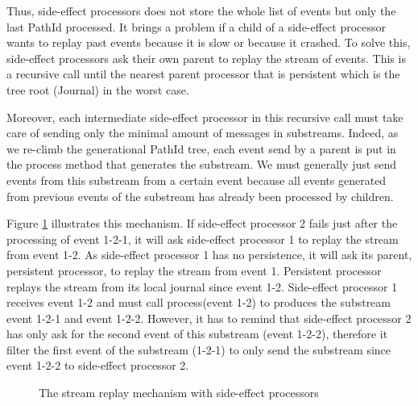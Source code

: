 Thus, side-effect processors does not store the whole list of events but only the last PathId processed. It brings a problem if a child of a side-effect processor
wants to replay past events because it is slow or because it crashed. To solve this, side-effect processors ask their own parent to replay the stream of events.
This is a recursive call until the nearest parent processor that is persistent which is the tree root (Journal) in the worst case. 

Moreover, each intermediate side-effect processor in this recursive call must take care of sending only the minimal amount of messages in substreams. Indeed,
as we re-climb the generational PathId tree, each event send by a parent is put in the process method that generates the substream. We must generally just send
events from this substream from a certain event because all events generated from previous events of the substream has already been processed by children. 

Figure \ref{fig:sideeffectreclimb} illustrates this mechanism. If side-effect processor 2 fails just after the processing of event 1-2-1, it will ask side-effect processor 1 to replay the stream from event 1-2. As side-effect processor 1 has no persistence, it will ask its parent, persistent processor, to replay the stream from
event 1. Persistent processor replays the stream from its local journal since event 1-2. Side-effect processor 1 receives event 1-2 and must call process(event 1-2) to
produces the substream event 1-2-1 and event 1-2-2. However, it has to remind that side-effect processor 2 has only ask for the second event of this substream (event 1-2-2), therefore it filter the first event of the substream (1-2-1) to only send the substream since event 1-2-2 to side-effect processor 2. 
\\

\begin{figure}[h]
  \begin{center} 
    \caption{The stream replay mechanism with side-effect processors}
    \label{fig:sideeffectreclimb}
  \end{center}
\end{figure}


